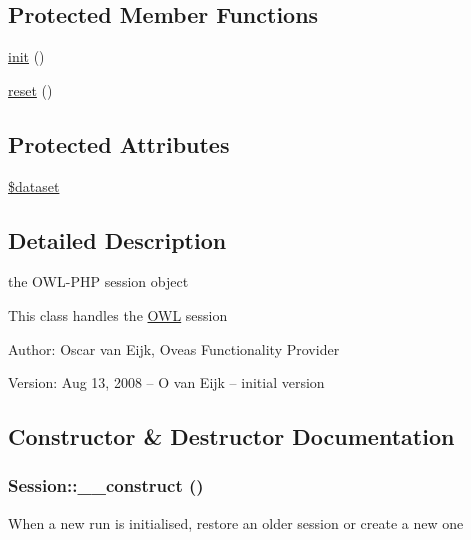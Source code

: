 \subsection*{Protected Member Functions}
\begin{CompactItemize}
\item 
\hyperlink{class__OWL_e0ef3ded56e8a6b34b6461e5a721cd3e}{init} ()
\item 
\hyperlink{class__OWL_2f2a042bcf31965194c03033df0edc9b}{reset} ()
\end{CompactItemize}
\subsection*{Protected Attributes}
\begin{CompactItemize}
\item 
\hyperlink{classSessionHandler_74c46fcfbadd4c4e6bacc73ddf350056}{\$dataset}
\end{CompactItemize}


\subsection{Detailed Description}
the OWL-PHP session object 

This class handles the \hyperlink{classOWL}{OWL} session \begin{Desc}
\item[Author:]Oscar van Eijk, Oveas Functionality Provider \end{Desc}
\begin{Desc}
\item[Version:]Aug 13, 2008 -- O van Eijk -- initial version \end{Desc}


\subsection{Constructor \& Destructor Documentation}
\hypertarget{classSession_36373ba15d6c8f932aeea02d7320d7c8}{
\subsubsection{\setlength{\rightskip}{0pt plus 5cm}Session::\_\-\_\-construct ()}}
\label{classSession_36373ba15d6c8f932aeea02d7320d7c8}


When a new run is initialised, restore an older session or create a new one 

